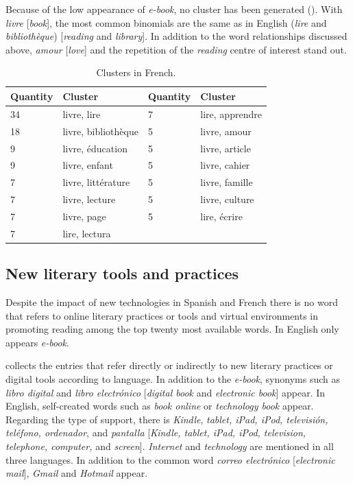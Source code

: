 \documentclass[english]{textolivre}
\begin{document}
Because of the low appearance of \textit{e-book}, no cluster has been generated (). With \textit{livre} [\textit{book}], the most common binomials are the same as in English (\textit{lire} and \textit{bibliothèque}) [\textit{reading} and \textit{library}]. In addition to the word relationships discussed above, \textit{amour} [\textit{love}] and the repetition of the \textit{reading} centre of interest stand out.

\begin{table}[h!]
\centering
\begin{threeparttable}
\caption{Clusters in French.}
\label{tab07}
\begin{tabular}{l l l l}
\toprule
 \textbf{Quantity} & \textbf{Cluster} & \textbf{Quantity} & \textbf{Cluster} \\
 \midrule
34 & livre, lire & 7 & lire, apprendre \\
18 & livre, bibliothèque & 5 & livre, amour \\
9 & livre, éducation & 5 & livre, article \\
9 & livre, enfant & 5 & livre, cahier \\
7 & livre, littérature & 5 & livre, famille \\
7 & livre, lecture & 5 & livre, culture \\
7 & livre, page & 5 & lire, écrire \\
7 & lire, lectura & & \\
\bottomrule
\end{tabular}
\end{threeparttable}
\end{table}

\subsection{New literary tools and practices}\label{sec-organizacao}
Despite the impact of new technologies \cite{alcocer_vazquez_practicas_2021,diaz_diaz_lectura_2022a,diaz-diaz_lector_2022b} in Spanish and French there is no word that refers to online literary practices or tools and virtual environments in promoting reading among the top twenty most available words. In English only appears \textit{e-book}.

 collects the entries that refer directly or indirectly to new literary practices or digital tools according to language. In addition to the \textit{e-book}, synonyms such as \textit{libro digital} and \textit{libro electrónico} [\textit{digital book} and \textit{electronic book}] appear. In English, self-created words such as \textit{book online} or \textit{technology book} appear. Regarding the type of support, there is \textit{Kindle}, \textit{tablet, iPad, iPod, televisión, teléfono, ordenador}, and \textit{pantalla} [\textit{Kindle, tablet, iPad, iPod, television, telephone, computer,} and \textit{screen}]. \textit{Internet} and \textit{technology} are mentioned in all three languages. In addition to the common word \textit{correo electrónico} [\textit{electronic mail}], \textit{Gmail} and \textit{Hotmail} appear.
\end{document}
